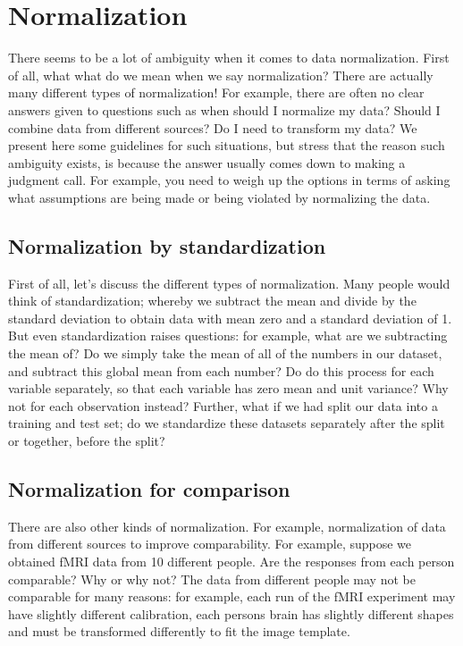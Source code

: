 

\chapter{Normalization}
\label{ch:normalization}



There seems to be a lot of ambiguity when it comes to data normalization. First of all, what what do we mean when we say normalization? There are actually many different types of normalization! For example, there are often no clear answers given to questions such as when should I normalize my data? Should I combine data from different sources? Do I need to transform my data? We present here some guidelines for such situations, but stress that the reason such ambiguity exists, is because the answer usually comes down to making a judgment call. For example, you need to weigh up the options in terms of asking what assumptions are being made or being violated by normalizing the data.

\section{Normalization by standardization}

First of all, let's discuss the different types of normalization. Many people would think of standardization; whereby we subtract the mean and divide by the standard deviation to obtain data with mean zero and a standard deviation of 1. But even standardization raises questions: for example, what are we subtracting the mean of? Do we simply take the mean of all of the numbers in our dataset, and subtract this global mean from each number? Do do this process for each variable separately, so that each variable has zero mean and unit variance? Why not for each observation instead? Further, what if we had split our data into a training and test set; do we standardize these datasets separately after the split or together, before the split?


\section{Normalization for comparison}

There are also other kinds of normalization. For example, normalization of data from different sources to improve comparability. For example, suppose we obtained fMRI data from 10 different people. Are the responses from each person comparable? Why or why not? The data from different people may not be comparable for many reasons: for example, each run of the fMRI experiment may have slightly different calibration, each persons brain has slightly different shapes and must be transformed differently to fit the image template. 

